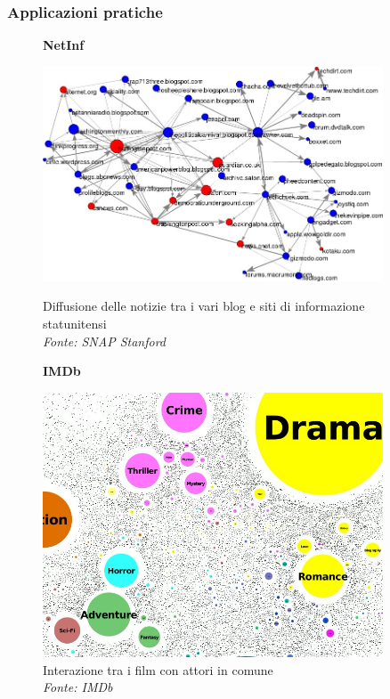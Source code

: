 \begin{frame}
	\frametitle{Applicazioni pratiche}
	
	\pause
	\centering
	\begin{figure}[h]
		\centering
		\begin{minipage}[t]{.49\textwidth}
			\centering
			\textbf{NetInf}\medskip
			
			\includegraphics[width=0.9\textwidth]{images/4_netinf}
			\caption{Diffusione delle notizie tra i vari blog e siti di informazione statunitensi\\ \textit{Fonte: SNAP Stanford}}
		\end{minipage}\hfill
		\pause
		\begin{minipage}[t]{.49\textwidth}
			\centering
			\textbf{IMDb}\medskip
			
			\includegraphics[width=0.9\textwidth]{images/6_imdb}
			\caption{Interazione tra i film con attori in comune\\ \textit{Fonte: IMDb}}
		\end{minipage}
	\end{figure}
\end{frame}

